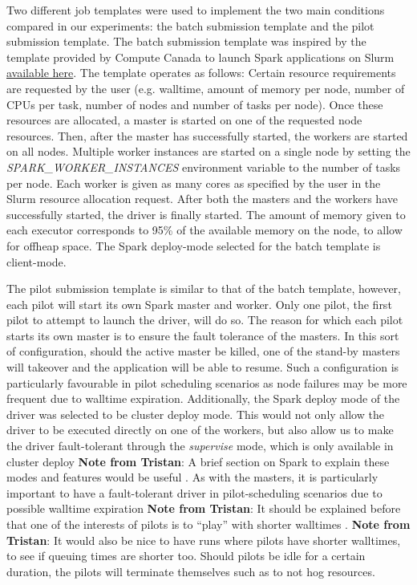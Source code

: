 \documentclass{IEEEtran}
\newcommand{\tristan}[1]{\color{red}\textbf{Note from Tristan}:
      #1 \color{black}}
\newcommand{\TG}[1]{\tristan{#1}}
\begin{document}
    Two different job templates were used to implement the two main
    conditions compared in our experiments: the batch submission
    template and the pilot submission template. The batch submission template was
    inspired by the template provided by Compute Canada to launch Spark applications 
    on Slurm \href{https://docs.computecanada.ca/wiki/Apache\_Spark/en}{available here}.
    The template operates as follows: Certain resource requirements are requested by
    the user (e.g. walltime, amount of memory per node, number of CPUs per task, number 
    of nodes and number of tasks per node). Once these resources are allocated, a 
    master is started on one of the requested node resources. Then, after the master
    has successfully started, the workers are started on all nodes. Multiple worker
    instances are started on a single node by setting the \textit{SPARK\_WORKER\_INSTANCES}
    environment variable to the number of tasks per node. Each worker is given as many
     cores as specified by the user in the Slurm resource allocation request.
    After both the masters and the workers have successfully started, the driver is finally
    started. The amount of memory given to each executor corresponds to 95\% of the 
    available memory on the node, to allow for offheap space. 
    The Spark deploy-mode selected for the batch template is client-mode. 

    The pilot submission template is similar to that of the batch template, however,
    each pilot will start its own Spark master and worker. Only one pilot,
    the first pilot to attempt to launch the driver, will do so. The reason for 
    which each pilot starts its own master is to ensure the fault tolerance of the 
    masters. In this sort of configuration, should the active master be killed, one
    of the stand-by masters will takeover and the application will be able to 
    resume. Such a configuration is particularly favourable in pilot scheduling 
    scenarios as node failures may be more frequent due to walltime expiration.
    Additionally, the Spark deploy mode of the driver was selected to be cluster deploy mode.
    This would not only allow the driver to be executed directly on one of the workers,
    but also allow us to make the driver fault-tolerant through the
    \textit{supervise} mode, which is only available in cluster deploy
    \TG{A brief section on Spark to explain these modes and features would
    be useful}. As with the masters, it is particularly important to have a
    fault-tolerant driver in pilot-scheduling scenarios due to possible
    walltime expiration \TG{It should be explained before that one of the interests of pilots
    is to ``play'' with shorter walltimes}. \TG{It would also be nice to have runs where pilots 
    have shorter walltimes, to see if queuing times are shorter too.}
    Should pilots be idle for a certain duration, the
    pilots will terminate themselves such as to not hog resources.
    
\end{document}
